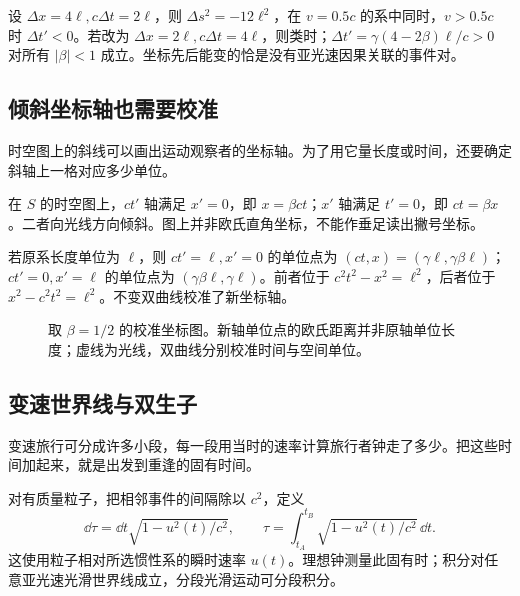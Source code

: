 \begin{example}[事件先后何时能反转？]
设 $\Delta x=4\ell,c\Delta t=2\ell$，则 $\Delta s^2=-12\ell^2$，在 $v=0.5c$ 的系中同时，$v>0.5c$ 时 $\Delta t'<0$。若改为 $\Delta x=2\ell,c\Delta t=4\ell$，则类时；$\Delta t'=\gamma(4-2\beta)\ell/c>0$ 对所有 $|\beta|<1$ 成立。坐标先后能变的恰是没有亚光速因果关联的事件对。
\end{example}

\subsection{倾斜坐标轴也需要校准}
时空图上的斜线可以画出运动观察者的坐标轴。为了用它量长度或时间，还要确定斜轴上一格对应多少单位。

在 $S$ 的时空图上，$ct'$ 轴满足 $x'=0$，即 $x=\beta ct$；$x'$ 轴满足 $t'=0$，即 $ct=\beta x$。二者向光线方向倾斜。图上并非欧氏直角坐标，不能作垂足读出撇号坐标。

若原系长度单位为 $\ell$，则 $ct'=\ell,x'=0$ 的单位点为 $(ct,x)=(\gamma\ell,\gamma\beta\ell)$；$ct'=0,x'=\ell$ 的单位点为 $(\gamma\beta\ell,\gamma\ell)$。前者位于 $c^2t^2-x^2=\ell^2$，后者位于 $x^2-c^2t^2=\ell^2$。不变双曲线校准了新坐标轴。
\begin{figure}[htbp]\centering
{}
\caption{取 $\beta=1/2$ 的校准坐标图。新轴单位点的欧氏距离并非原轴单位长度；虚线为光线，双曲线分别校准时间与空间单位。}\label{fig:sr-axes}
\end{figure}

\subsection{变速世界线与双生子}
变速旅行可分成许多小段，每一段用当时的速率计算旅行者钟走了多少。把这些时间加起来，就是出发到重逢的固有时间。

对有质量粒子，把相邻事件的间隔除以 $c^2$，定义
\begin{equation}\label{eq:sr-proper}
\dd\tau=\dd t\sqrt{1-u^2(t)/c^2},\qquad
\boxed{\tau=\int_{t_A}^{t_B}\sqrt{1-u^2(t)/c^2}\,\dd t.}
\end{equation}
这使用粒子相对所选惯性系的瞬时速率 $u(t)$。理想钟测量此固有时；积分对任意亚光速光滑世界线成立，分段光滑运动可分段积分。

